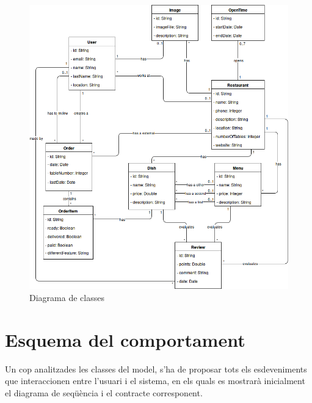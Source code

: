 \begin{figure}[!h]
\centering
\includegraphics[scale=0.5]{Figures/diagrama_clases.png}
\caption{Diagrama de classes}
\end{figure}


\clearpage
\section{Esquema del comportament}

Un cop analitzades les classes del model, s'ha de proposar tots els esdeveniments que interaccionen entre l'usuari i el sistema, en els quals es mostrarà inicialment el diagrama de seqüència i el contracte corresponent.
\\

